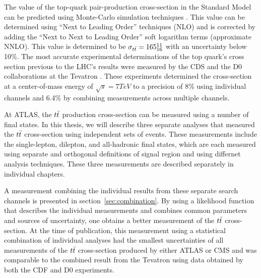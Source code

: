 The value of the top-quark pair-production cross-section in the Standard Model can be predicted using Monte-Carlo simulation techniques \cite{TOP_XSC_THEORY} \cite{Langenfeld:2009ue} \cite{THRESHOLD_EXPANSION_XSC}.
This value can be determined using ``Next to Leading Order'' techniques (NLO) and is corrected by adding the ``Next to Next to Leading Order'' soft logarithm terms (approximate NNLO).
This value is determined to be $\sigma_{t\bar{t}} = 165^{11}_{16}$ with an uncertainty below 10\%.
The most accurate experimental determinations of the top quark's cross section previous to the LHC's results were measured by the CDS and the D0 collaborations at the Tevatron \cite{TEVATRON_XSC_LJETS} \cite{TEVATRON_XSC_DILEP}.
These experiments determined the cross-section at a center-of-mass energy of $\sqrt{s} = 7 TeV$ to a precision of 8\% using individual channels and 6.4\% by combining measurements across multiple channels.

At ATLAS, the $t\bar{t}$ production cross-section can be measured using a number of final states.
In this thesis, we will describe three separate analyses that measured the $t\bar{t}$ cross-section using independent sets of events.
These measurements include the single-lepton, dilepton, and all-hadronic final states, which are each measured using separate and orthogonal
definitions of signal region and using differnet analysis techniques.
These three measurements are described separately in individual chapters.

A measurement combining the individual results from these separate search channels is presented in section~\ref{sec:combination}.
By using a likelihood function that describes the individual measurements and combines common parameters and sources of uncertainty,
one obtains a better measurement of the $t\bar{t}$ cross-section.
At the time of publication, this measurement using a statistical combination of individual analyses had the smallest uncertainties
of all measurements of the $t\bar{t}$ cross-section produced by either ATLAS or CMS and was comparable to the combined result from 
the Tevatron using data obtained by both the CDF and D0 experiments.


